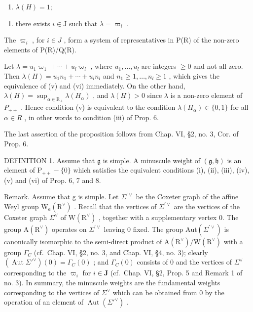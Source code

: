 \begin{enumerate}
\def\labelenumi{(\alph{enumi})}
\setcounter{enumi}{21}
\tightlist
\item
  \(\lambda(H)=1;\)
\end{enumerate}

\begin{enumerate}
\def\labelenumi{(\roman{enumi})}
\setcounter{enumi}{5}
\tightlist
\item
  there exists \(i \in \mathrm{J}\) such that \(\lambda = \varpi_i\) .
\end{enumerate}

The \(\varpi_{i}\) , for \(i \in J\) , form a system of representatives in P(R) of the non-zero elements of P(R)/Q(R).

Let \(\lambda = u_{1}\varpi_{1} + \cdots + u_{l}\varpi_{l}\) , where \(u_{1}, \ldots, u_{l}\) are integers \(\geq 0\) and not all zero. Then \(\lambda(H) = u_{1}n_{1} + \cdots + u_{l}n_{l}\) and \(n_{1} \geq 1, \ldots, n_{l} \geq 1\) , which gives the equivalence of (v) and (vi) immediately. On the other hand, \(\lambda(H) = \sup_{\alpha \in \mathrm{R}_{+}} \lambda(H_{\alpha})\) , and \(\lambda(H) > 0\) since \(\lambda\) is a non-zero element of \(P_{++}\) . Hence condition (v) is equivalent to the condition \(\lambda(H_{\alpha}) \in \{0, 1\}\) for all \(\alpha \in R\) , in other words to condition (iii) of Prop. 6.

The last assertion of the proposition follows from Chap. VI, §2, no. 3, Cor. of Prop. 6.

DEFINITION 1. Assume that \(\mathfrak{g}\) is simple. A minuscule weight of \((\mathfrak{g},\mathfrak{h})\) is an element of \(\mathrm{P}_{++} - \{0\}\) which satisfies the equivalent conditions (i), (ii), (iii), (iv), (v) and (vi) of Prop. 6, 7 and 8.

Remark. Assume that g is simple. Let \(\Sigma^{\prime\vee}\) be the Coxeter graph of the affine Weyl group \(\mathrm{W}_{a}(\mathrm{R}^{\vee})\) . Recall that the vertices of \(\Sigma^{\prime\vee}\) are the vertices of the Coxeter graph \(\Sigma^{\vee}\) of \(\mathrm{W}(\mathrm{R}^{\vee})\) , together with a supplementary vertex 0. The group \(\mathrm{A}(\mathrm{R}^{\vee})\) operates on \(\Sigma^{\prime\vee}\) leaving 0 fixed. The group \(\mathrm{Aut}(\Sigma^{\prime\vee})\) is canonically isomorphic to the semi-direct product of \(\mathrm{A}(\mathrm{R}^{\vee})/\mathrm{W}(\mathrm{R}^{\vee})\) with a group \(\Gamma_{C}\) (cf.~Chap. VI, §2, no. 3, and Chap. VI, §4, no. 3); clearly \((\operatorname{Aut} \Sigma'^{\vee})(0) = \Gamma_C(0)\) ; and \(\Gamma_C(0)\) consists of 0 and the vertices of \(\Sigma^{\vee}\) corresponding to the \(\varpi_i\) for \(i \in \mathbf{J}\) (cf.~Chap. VI, §2, Prop. 5 and Remark 1 of no. 3). In summary, the minuscule weights are the fundamental weights corresponding to the vertices of \(\Sigma^{\vee}\) which can be obtained from 0 by the operation of an element of \(\operatorname{Aut}(\Sigma'^{\vee})\) .

